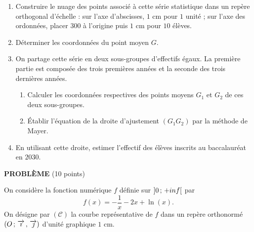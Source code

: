 \begin{devoirsurveille}
\begin{enumerate}[label=\textbf{\arabic*.}, leftmargin=*, itemsep=0.25em]
  \item Construire le nuage des points associé à cette série statistique
        dans un repère orthogonal d'échelle : sur l'axe d'abscisses, $1$ cm
        pour $1$ unité ; sur l'axe des ordonnées, placer $300$ à l'origine
        puis $1$ cm pour $10$ élèves. 
  \item Déterminer les coordonnées du point moyen $G$. 
  \item On partage cette série en deux sous-groupes d'effectifs égaux. La
        première partie est composée des trois premières années et la
        seconde des trois dernières années.
    \begin{enumerate}[label=\textbf{\alph*)}, leftmargin=1.4em, itemsep=0.15em]
      \item Calculer les coordonnées respectives des points moyens $G_{1}$
            et $G_{2}$ de ces deux sous-groupes. 
      \item Établir l'équation de la droite d'ajustement
            $\left(G_{1}G_{2}\right)$ par la méthode de Mayer.
    \end{enumerate}
  \item En utilisant cette droite, estimer l'effectif des élèves inscrits au
        baccalauréat en $2030$. 
\end{enumerate}

\vspace{0.7em}
\noindent\textbf{\sffamily PROBLÈME} \hfill \textup{(10 points)}

On considère la fonction numérique $f$ définie sur
$\left]0\,;\,+inf\right[$ par
\[
  f(x) = -\frac1x-2x+\ln(x) .
\]
On désigne par $(\mathcal C)$ la courbe représentative de $f$ dans un repère
orthonormé $\left(O\,;\,\overrightarrow{\imath}\,,\,\overrightarrow{\jmath}\right)$ d'unité graphique $1$ cm.


\end{devoirsurveille}
